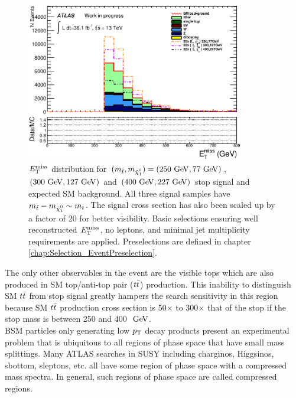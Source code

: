 \begin{figure}[h!]
\centering
    \includegraphics[width=0.85\textwidth]{figures/plotSR/SR_eT_miss_0SR.eps}\hspace{0.05\textwidth}
\caption[Stop signal with $m_{\stop}-m_{\ninoone} \sim m_t$ and SM background $\met$ distribution after loose preliminary selections for $\met>250 \gev$, zero leptons and at least four jets]{ $\met$ distribution for $(m_{\stop}, m_{\ninoone}) = (250 \gev,77 \gev)$, $(300 \gev, 127 \gev)$ and $(400 \gev, 227 \gev)$ stop signal and expected SM background.  All three signal samples have $m_{\stop}-m_{\ninoone} \sim m_t$.  The signal cross section has also been scaled up by a factor of 20 for better visibility.  Basic selections ensuring well reconstructed $\met$, no leptons, and minimal jet multiplicity requirements are applied.  Preselections are defined in chapter \ref{chap:Selection_EventPreselection}. }
\label{fig:presel:MET_diag}
\end{figure}

\indent The only other observables in the event are the visible tops which are also produced in SM top/anti-top pair ($t\bar{t}$) production.  This inability to distinguish SM $t\bar{t}$ from stop signal greatly hampers the search sensitivity in this region because SM $t\bar{t}$ production cross section is 50$\times$ to 300$\times$ that of the stop if the stop mass is between 250 and 400 $\gev$. \\

\indent BSM particles only generating low $p_{\mathrm{T}}$ decay products present an experimental problem that is ubiquitous to all regions of phase space that have small mass splittings.  Many ATLAS searches in SUSY including charginos, Higgsinos, sbottom, sleptons, etc. all have some region of phase space with a compressed mass spectra.  In general, such regions of phase space are called compressed regions. \\

